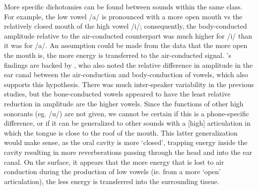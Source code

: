 
More specific dichotomies can be found between sounds within the same class. For example, the low vowel /a/ is pronounced with a more open mouth vs the relatively closed mouth of the high vowel /i/; consequently, the body-conducted amplitude relative to the air-conducted counterpart was much higher for /i/ than it was for /a/. An assumption could be made from the data that the more open the mouth is, the more energy is transferred to the air-conducted signal.%
\cite{reinfeldt:10}'s findings are backed by \cite{bekesy:60}, who also noted %
the relative difference in amplitude in the ear canal between the air-conduction and body-conduction of vowels, %
which also supports this hypothesis.  There was much inter-speaker variability in the previous studies, but the bone-conducted vowels appeared to have the least relative reduction in amplitude are the higher vowels.  Since the functions of other high sonorants (eg. /u/) are not given, we cannot be certain if this is a phone-specific difference, or if it can be generalized to other sounds with a [high] articulation in which the tongue is close to the roof of the mouth.  This latter generalization would make sense, as the oral cavity is more `closed', trapping energy inside the cavity resulting in more reverberations passing through the head and into the ear canal.
%
%
On the surface, it appears that the more energy that is lost to air conduction during the production of low vowels (ie. from a more `open' articulation), the less energy is transferred into the surrounding tissue.

